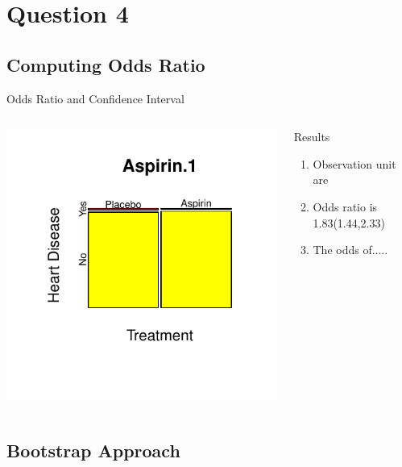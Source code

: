 \documentclass[a4paper,9pt]{beamer}\usepackage[]{graphicx}\usepackage[]{color}
\makeatletter
\def\maxwidth{ %
  \ifdim\Gin@nat@width>\linewidth
    \linewidth
  \else
    \Gin@nat@width
  \fi
}
\newenvironment{knitrout}{}{} %
\makeatother
\begin{document}
\section{Question 4}
\subsection{Computing Odds Ratio}

\begin{frame}{Odds Ratio and Confidence Interval}
\begin{columns}
\begin{knitrout}
\color{fgcolor}
\includegraphics[width=\maxwidth]{figure/oddsplot-1} 

\end{knitrout}
\begin{block}{Results}
\begin{enumerate}[i]
\item Observation unit are
\item Odds ratio is 1.83(1.44,2.33)
\item The odds of.....
\end{enumerate}
\end{block}
\end{columns}
\end{frame}

\subsection{Bootstrap Approach}
\end{document}
